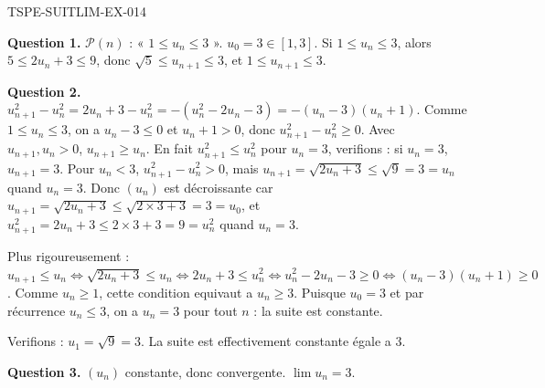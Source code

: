 \begin{corrige}{TSPE-SUITLIM-EX-014}

\textbf{Question 1.} $\mathcal{P}(n)$ : « $1 \leq u_n \leq 3$ ». $u_0 = 3 \in [1,3]$. Si $1 \leq u_n \leq 3$, alors $5 \leq 2u_n+3 \leq 9$, donc $\sqrt{5} \leq u_{n+1} \leq 3$, et $1 \leq u_{n+1} \leq 3$.

\textbf{Question 2.} $u_{n+1}^2 - u_n^2 = 2u_n + 3 - u_n^2 = -(u_n^2 - 2u_n - 3) = -(u_n-3)(u_n+1)$. Comme $1 \leq u_n \leq 3$, on a $u_n-3 \leq 0$ et $u_n+1 > 0$, donc $u_{n+1}^2 - u_n^2 \geq 0$. Avec $u_{n+1}, u_n > 0$, $u_{n+1} \geq u_n$. En fait $u_{n+1}^2 \leq u_n^2$ pour $u_n = 3$, verifions : si $u_n = 3$, $u_{n+1} = 3$. Pour $u_n < 3$, $u_{n+1}^2 - u_n^2 > 0$, mais $u_{n+1} = \sqrt{2u_n+3} \leq \sqrt{9} = 3 = u_n$ quand $u_n = 3$. Donc $(u_n)$ est décroissante car $u_{n+1} = \sqrt{2u_n+3} \leq \sqrt{2 \times 3 + 3} = 3 = u_0$, et $u_{n+1}^2 = 2u_n+3 \leq 2 \times 3+3 = 9 = u_n^2$ quand $u_n=3$.

Plus rigoureusement : $u_{n+1} \leq u_n \iff \sqrt{2u_n+3} \leq u_n \iff 2u_n+3 \leq u_n^2 \iff u_n^2-2u_n-3 \geq 0 \iff (u_n-3)(u_n+1) \geq 0$. Comme $u_n \geq 1$, cette condition equivaut a $u_n \geq 3$. Puisque $u_0 = 3$ et par récurrence $u_n \leq 3$, on a $u_n = 3$ pour tout $n$ : la suite est constante.

Verifions : $u_1 = \sqrt{9} = 3$. La suite est effectivement constante égale a $3$.

\textbf{Question 3.} $(u_n)$ constante, donc convergente. $\boxed{\lim u_n = 3}$.

\end{corrige}
